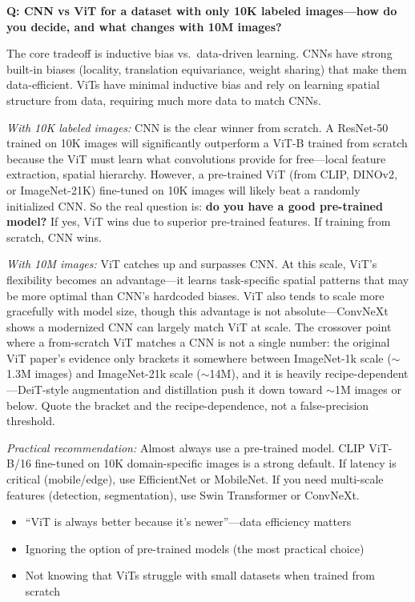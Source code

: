 \begin{interviewq}
\textbf{Q: CNN vs ViT for a dataset with only 10K labeled images---how do you decide, and what changes with 10M images?}

 \quad {} \quad \badgefreq{\freqhigh}

\stronganswer The core tradeoff is inductive bias vs.\ data-driven learning. CNNs have strong built-in biases (locality, translation equivariance, weight sharing) that make them data-efficient. ViTs have minimal inductive bias and rely on learning spatial structure from data, requiring much more data to match CNNs.

\textit{With 10K labeled images:} CNN is the clear winner from scratch. A ResNet-50 trained on 10K images will significantly outperform a ViT-B trained from scratch because the ViT must learn what convolutions provide for free---local feature extraction, spatial hierarchy. However, a pre-trained ViT (from CLIP, DINOv2, or ImageNet-21K) fine-tuned on 10K images will likely beat a randomly initialized CNN. So the real question is: \textbf{do you have a good pre-trained model?} If yes, ViT wins due to superior pre-trained features. If training from scratch, CNN wins.

\textit{With 10M images:} ViT catches up and surpasses CNN. At this scale, ViT's flexibility becomes an advantage---it learns task-specific spatial patterns that may be more optimal than CNN's hardcoded biases. ViT also tends to scale more gracefully with model size, though this advantage is not absolute---ConvNeXt shows a modernized CNN can largely match ViT at scale. The crossover point where a from-scratch ViT matches a CNN is not a single number: the original ViT paper's evidence only brackets it somewhere between ImageNet-1k scale ($\sim$1.3M images) and ImageNet-21k scale ($\sim$14M), and it is heavily recipe-dependent---DeiT-style augmentation and distillation push it down toward $\sim$1M images or below. Quote the bracket and the recipe-dependence, not a false-precision threshold.

\textit{Practical recommendation:} Almost always use a pre-trained model. CLIP ViT-B/16 fine-tuned on 10K domain-specific images is a strong default. If latency is critical (mobile/edge), use EfficientNet or MobileNet. If you need multi-scale features (detection, segmentation), use Swin Transformer or ConvNeXt.

\redflags
\begin{itemize}
    \item ``ViT is always better because it's newer''---data efficiency matters
    \item Ignoring the option of pre-trained models (the most practical choice)
    \item Not knowing that ViTs struggle with small datasets when trained from scratch
\end{itemize}


\end{interviewq}
